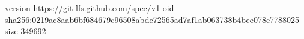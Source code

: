 version https://git-lfs.github.com/spec/v1
oid sha256:0219ac8aab6bf684679c96508abde72565ad7af1ab063738b4bee078e7788025
size 349692
